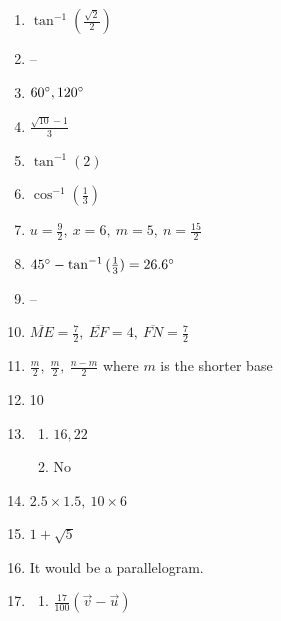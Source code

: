 \documentclass{article}
\begin{document}
\begin{enumerate}
\begin{enumerate}
	\end{enumerate}
	
\item $\tan^{-1}{(\frac{\sqrt{2}}{2})}$

\item --

\item $60\degree, 120\degree$

\item $\frac{\sqrt{10} - 1}{3}$

\item $\tan^{-1}{(2)}$

\item $\cos^{-1}{(\frac{1}{3})}$

\item $u = \frac{9}{2}, \ x = 6, \ m = 5, \ n = \frac{15}{2}$

\item $45\degree - \tan^{-1}{(\frac{1}{3})} = 26.6\degree$

\item --

\item $\overline{ME} = \frac{7}{2}, \ \overline{EF} = 4, \ \overline{FN} = \frac{7}{2}$

\item $\frac{m}{2}, \ \frac{m}{2}, \ \frac{n - m}{2}$ where $m$ is the shorter base

\item 10

\item

	\begin{enumerate}
	
	\item $16, 22$
	
	\item No
	
	\end{enumerate}
	
\item $2.5 \times 1.5, \ 10 \times 6$

\item $1 + \sqrt{5}$

\item It would be a parallelogram.

\item

	\begin{enumerate}
	
	\item $\frac{17}{100} (\vec{v} - \vec{u})$
	

\end{enumerate}
\end{enumerate}
\end{document}

